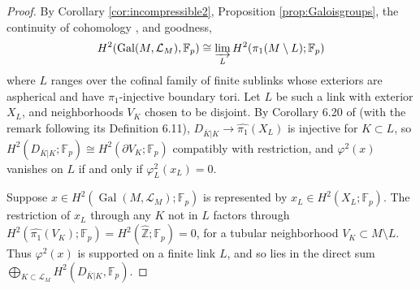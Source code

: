 \documentclass{amsart}
\theoremstyle{plain}
\theoremstyle{definition}
\theoremstyle{plain}
\theoremstyle{plain}
\theoremstyle{plain}
\theoremstyle{remark}
\theoremstyle{remark}
\theoremstyle{plain}
\theoremstyle{definition}
\theoremstyle{plain}
\DeclareMathOperator{\Gal}{\mathrm{Gal}}
\theoremstyle{plain}
\theoremstyle{plain}
\numberwithin{equation}{section}
\begin{document}
\begin{proof}
By Corollary \ref{cor:incompressible2}, Proposition \ref{prop:Galoisgroups}, the continuity of cohomology \cite{serre}, and goodness, 
\begin{equation}
    H^2(\Gal(M, \mathcal L_M),\mathbb F_p) \cong \varinjlim_LH^2(\pi_1(M\setminus L); \mathbb F_p)
\end{equation}
where $L$ ranges over the cofinal family of finite sublinks whose exteriors are aspherical and have $\pi_1$-injective boundary tori. Let $L$ be such a link with exterior $X_L$, and neighborhoods $V_K$ chosen to be disjoint. By Corollary 6.20 of \cite{wilkes} (with the remark following its Definition 6.11), $D_{\overline K|K} \to \widehat{\pi_1}(X_L)$ is injective for $K \subset L$, so $H^2(D_{\overline K|K}; \mathbb F_p) \cong H^2(\partial V_K; \mathbb F_p)$ compatibly with restriction, and $\varphi^2(x)$ vanishes on $L$ if and only if $\varphi_L^2(x_L) = 0$. 

\medskip

Suppose $x \in H^2(\Gal(M, \mathcal L_M); \mathbb F_p)$ is represented by $x_L \in H^2(X_L; \mathbb F_p)$. The restriction of $x_L$ through any $K$ not in $L$ factors through $H^2(\widehat{\pi_1}(V_K); \mathbb F_p) = H^2(\widehat{\mathbb Z}; \mathbb F_p) = 0$, for a tubular neighborhood $V_K \subset M \setminus L$. Thus $\varphi^2(x)$ is supported on a finite link $L$, and so lies in the direct sum $\bigoplus_{K \subset \mathcal L_M}H^2(D_{\overline K|K}, \mathbb F_p)$. 

\medskip


\end{proof}
\end{document}
